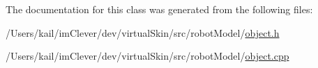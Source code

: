 The documentation for this class was generated from the following files:\begin{DoxyCompactItemize}
\item 
/Users/kail/imClever/dev/virtualSkin/src/robotModel/\hyperlink{object_8h}{object.h}\item 
/Users/kail/imClever/dev/virtualSkin/src/robotModel/\hyperlink{object_8cpp}{object.cpp}\end{DoxyCompactItemize}
